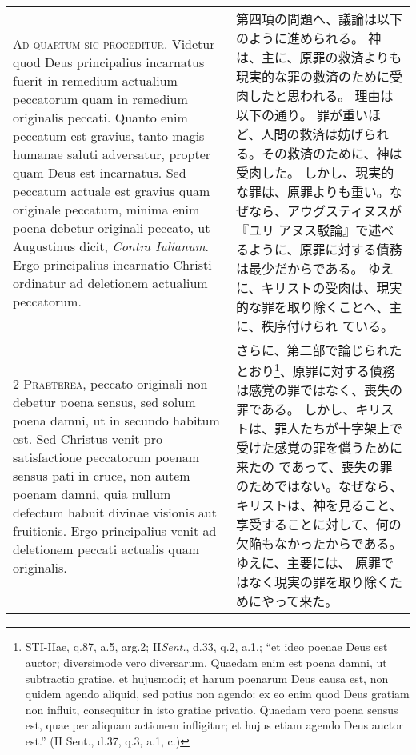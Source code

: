 \documentclass[10pt]{jsarticle} %
\begin{document}
\begin{longtable}{p{21em}p{21em}}



{\Huge A}{\scshape d quartum sic proceditur}. Videtur quod
Deus principalius incarnatus fuerit in remedium actualium peccatorum
quam in remedium originalis peccati. Quanto enim peccatum est gravius,
tanto magis humanae saluti adversatur, propter quam Deus est
incarnatus. Sed peccatum actuale est gravius quam originale peccatum,
minima enim poena debetur originali peccato, ut Augustinus dicit, {\itshape Contra
Iulianum}. Ergo principalius incarnatio Christi ordinatur ad deletionem
actualium peccatorum.


&

第四項の問題へ、議論は以下のように進められる。
神は、主に、原罪の救済よりも現実的な罪の救済のために受肉したと思われる。
 理由は以下の通り。
罪が重いほど、人間の救済は妨げられる。その救済のために、神は受肉した。
しかし、現実的な罪は、原罪よりも重い。なぜなら、アウグスティヌスが『ユリ
 アヌス駁論』で述べるように、原罪に対する債務は最少だからである。
ゆえに、キリストの受肉は、現実的な罪を取り除くことへ、主に、秩序付けられ
 ている。


\\


2 {\scshape Praeterea}, peccato originali non debetur
poena sensus, sed solum poena damni, ut in secundo habitum est. Sed
Christus venit pro satisfactione peccatorum poenam sensus pati in cruce,
non autem poenam damni, quia nullum defectum habuit divinae visionis aut
fruitionis. Ergo principalius venit ad deletionem peccati actualis quam
originalis.


&


さらに、第二部で論じられたとおり\footnote{STI-IIae, q.87, a.5, arg.2;
 II{\itshape Sent.}, d.33, q.2, a.1.; ``et ideo poenae Deus est auctor;
 diversimode vero diversarum. Quaedam enim est poena damni, ut
 subtractio gratiae, et hujusmodi; et harum poenarum Deus causa est, non
 quidem agendo aliquid, sed potius non agendo: ex eo enim quod Deus
 gratiam non influit, consequitur in isto gratiae privatio. Quaedam vero
 poena sensus est, quae per aliquam actionem infligitur; et hujus etiam
 agendo Deus auctor est.'' (II Sent., d.37, q.3, a.1, c.)
}、原罪に対する債務は感覚の罪ではなく、喪失の罪である。
しかし、キリストは、罪人たちが十字架上で受けた感覚の罪を償うために来たの
 であって、喪失の罪のためではない。なぜなら、キリストは、神を見ること、
 享受することに対して、何の欠陥もなかったからである。ゆえに、主要には、
 原罪ではなく現実の罪を取り除くためにやって来た。


\end{longtable}
\end{document}
